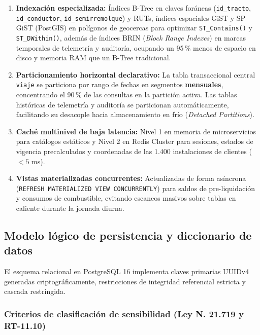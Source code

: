 \begin{enumerate}
    \item \textbf{Indexación especializada:} Índices B-Tree en claves foráneas (\texttt{id\_tracto}, \texttt{id\_conductor}, \texttt{id\_semirremolque}) y RUTs, índices espaciales GiST y SP-GiST (PostGIS) en polígonos de geocercas para optimizar \texttt{ST\_Contains()} y \texttt{ST\_DWithin()}, además de índices BRIN (\textit{Block Range Indexes}) en marcas temporales de telemetría y auditoría, ocupando un 95\,\% menos de espacio en disco y memoria RAM que un B-Tree tradicional.
    \item \textbf{Particionamiento horizontal declarativo:} La tabla transaccional central \texttt{viaje} se particiona por rango de fechas en segmentos \textbf{mensuales}, concentrando el 90\,\% de las consultas en la partición activa. Las tablas históricas de telemetría y auditoría se particionan automáticamente, facilitando su desacople hacia almacenamiento en frío (\textit{Detached Partitions}).
    \item \textbf{Caché multinivel de baja latencia:} Nivel 1 en memoria de microservicios para catálogos estáticos y Nivel 2 en Redis Cluster para sesiones, estados de vigencia precalculados y coordenadas de las 1.400 instalaciones de clientes ($< 5$ ms).
    \item \textbf{Vistas materializadas concurrentes:} Actualizadas de forma asíncrona (\texttt{REFRESH MATERIALIZED VIEW CONCURRENTLY}) para saldos de pre-liquidación y consumos de combustible, evitando escaneos masivos sobre tablas en caliente durante la jornada diurna.
\end{enumerate}

\subsection{Modelo lógico de persistencia y diccionario de datos}

El esquema relacional en PostgreSQL 16 implementa claves primarias UUIDv4 generadas criptográficamente, restricciones de integridad referencial estricta y cascada restringida.

\subsubsection{Criterios de clasificación de sensibilidad (Ley N.\textordmasculine{} 21.719 y RT-11.10)}

